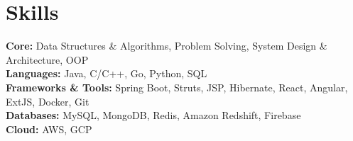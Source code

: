 \documentclass[letterpaper,11pt]{article}
\begin{document}
    \section{Skills}\vspace{-0.3cm}
    \begin{multicols}{2}
        \setlength{\columnsep}{0.5cm} %
        \textbf{Core:}
        Data Structures \& Algorithms, Problem Solving, System Design \& Architecture, OOP\\[0.1cm]

        \textbf{Languages:}
        Java, C/C++, Go, Python, SQL\\[0.1cm]

        \textbf{Frameworks \& Tools:}
        Spring Boot, Struts, JSP, Hibernate, React, Angular, ExtJS, Docker, Git\\[0.1cm]

        \textbf{Databases:}
        MySQL, MongoDB, Redis, Amazon Redshift, Firebase\\[0.1cm]

        \textbf{Cloud:}
        AWS, GCP
    \end{multicols}
\end{document}
